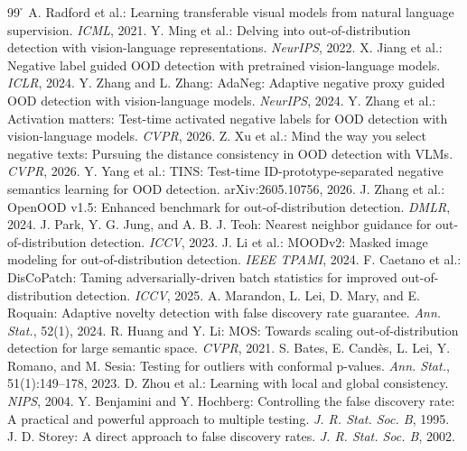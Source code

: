 \begin{thebibliography}{99}
\footnotesize{}\h\setlength{\itemsep}{0pt}\setlength{\parskip}{0pt}\setlength{\parsep}{0pt}
 A. Radford et al.: Learning transferable visual models from natural language supervision. \textit{ICML}, 2021.
 Y. Ming et al.: Delving into out-of-distribution detection with vision-language representations. \textit{NeurIPS}, 2022.
 X. Jiang et al.: Negative label guided OOD detection with pretrained vision-language models. \textit{ICLR}, 2024.
 Y. Zhang and L. Zhang: AdaNeg: Adaptive negative proxy guided OOD detection with vision-language models. \textit{NeurIPS}, 2024.
 Y. Zhang et al.: Activation matters: Test-time activated negative labels for OOD detection with vision-language models. \textit{CVPR}, 2026.
 Z. Xu et al.: Mind the way you select negative texts: Pursuing the distance consistency in OOD detection with VLMs. \textit{CVPR}, 2026.
 Y. Yang et al.: TINS: Test-time ID-prototype-separated negative semantics learning for OOD detection. arXiv:2605.10756, 2026.
 J. Zhang et al.: OpenOOD v1.5: Enhanced benchmark for out-of-distribution detection. \textit{DMLR}, 2024.
 J. Park, Y. G. Jung, and A. B. J. Teoh: Nearest neighbor guidance for out-of-distribution detection. \textit{ICCV}, 2023.
 J. Li et al.: MOODv2: Masked image modeling for out-of-distribution detection. \textit{IEEE TPAMI}, 2024.
 F. Caetano et al.: DisCoPatch: Taming adversarially-driven batch statistics for improved out-of-distribution detection. \textit{ICCV}, 2025.
 A. Marandon, L. Lei, D. Mary, and E. Roquain: Adaptive novelty detection with false discovery rate guarantee. \textit{Ann. Stat.}, 52(1), 2024.
 R. Huang and Y. Li: MOS: Towards scaling out-of-distribution detection for large semantic space. \textit{CVPR}, 2021.
 S. Bates, E. Cand\`{e}s, L. Lei, Y. Romano, and M. Sesia: Testing for outliers with conformal p-values. \textit{Ann. Stat.}, 51(1):149--178, 2023.
 D. Zhou et al.: Learning with local and global consistency. \textit{NIPS}, 2004.
 Y. Benjamini and Y. Hochberg: Controlling the false discovery rate: A practical and powerful approach to multiple testing. \textit{J. R. Stat. Soc. B}, 1995.
 J. D. Storey: A direct approach to false discovery rates. \textit{J. R. Stat. Soc. B}, 2002.

\end{thebibliography}
